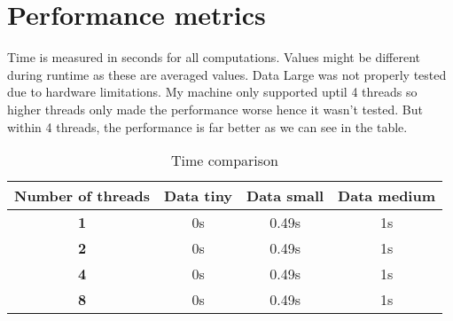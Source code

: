 \documentclass[a4paper,12pt]{article}
\begin{document}
\section*{Performance metrics}
Time is measured in seconds for all computations. Values might be different during runtime as these are averaged values. Data Large was not properly tested due to hardware limitations. My machine only supported uptil 4 threads so higher threads only made the performance worse hence it wasn't tested. But within 4 threads, the performance is far better as we can see in the table.
\begin{table}[ht]
    \centering
    \caption{Time comparison}
    \begin{tabular}{|c|c|c|c|}
        \hline
        \textbf{Number of threads} & \textbf{Data tiny} & \textbf{Data small} & \textbf{Data medium} \\
        \hline
        \textbf{1} & 0s & 0.49s & 1s\\
        \hline
        \textbf{2} & 0s & 0.49s & 1s\\
        \hline
        \textbf{4} & 0s & 0.49s & 1s\\
        \hline
        \textbf{8} & 0s & 0.49s & 1s\\
        \hline
        
    \end{tabular}
\end{table}
\end{document}
